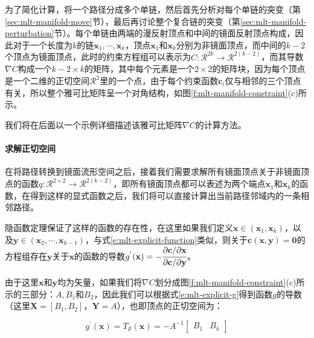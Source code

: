 为了简化计算，\cite{a:ManifoldExplorationAMarkovChainMonteCarloTechniqueforRenderingSceneswithDifficultSpecularTransport}将一个路径分成多个单链，然后首先分析对每个单链的突变（第\ref{sec:mlt-manifold-move}节），最后再讨论整个复合链的突变（第\ref{sec:mlt-manifold-perturbation}节）。每个单链由两端的漫反射顶点和中间的镜面反射顶点构成，因此对于一个长度为$k$的链$\mathbf{x}_1,\cdots,\mathbf{x}_k$，顶点$\mathbf{x}_1$和$\mathbf{x}_k$分别为非镜面顶点，而中间的$k-2$个顶点为镜面顶点，此时的约束方程组可以表示为$C:\mathcal{R}^{2k}\to\mathcal{R}^{2(k-2)}$，而其导数$\nabla C$构成一个$k-2\times k$的矩阵，其中每个元素是一个$2\times 2$的矩阵块，因为每个顶点是一个二维的正切空间$\mathcal{R}^{2}$里的一个点，由于每个约束函数$\mathbf{c}_i$仅与相邻的三个顶点有关，所以整个雅可比矩阵呈一个对角结构，如图\ref{f:mlt-manifold-constraint}(c)所示。

我们将在后面以一个示例详细描述该雅可比矩阵$\nabla C$的计算方法。




\paragraph{求解正切空间}
在将路径转换到镜面流形空间之后，接着我们需要求解所有镜面顶点关于非镜面顶点的函数$q:\mathcal{R}^{2\times 2}\to\mathcal{R}^{2(k-2)}$，即所有镜面顶点都可以表述为两个端点$\mathbf{x}_1$和$\mathbf{x}_k$的函数，在得到这样的显式函数之后，我们将可以直接计算出当前路径邻域内的一条相邻路径。

隐函数定理保证了这样的函数的存在性，在这里如果我们定义$\mathbf{x}\in (\mathbf{x}_1,\mathbf{x}_k)$，以及$\mathbf{y}\in (\mathbf{x}_2,\cdots,\mathbf{x}_{k-1})$，与式\ref{e:mlt-explicit-function}类似，则关于$\mathbf{c}(\mathbf{x},\mathbf{y})=\mathbf{0}$的方程组存在$\mathbf{y}$关于$\mathbf{x}$的函数的导数$g^{'}(\mathbf{x})=-\cfrac{{\rm \partial} \mathbf{c}/{\rm \partial} \mathbf{x}}{{\rm \partial} \mathbf{c}/{\rm \partial} \mathbf{y}}$。

由于这里$\mathbf{x}$和$\mathbf{y}$均为矢量，如果我们将$\nabla C$划分成图\ref{f:mlt-manifold-constraint}(c)所示的三部分：$A,B_1$和$B_2$，因此我们可以根据式\ref{e:mlt-explicit-g}得到函数$g$的导数（这里$\mathbf{X}=[B_1,B_2]$，$\mathbf{Y}=A$），也即顶点的正切空间为：

\begin{equation}
	g^{'}({\mathbf{x}})=T_{\mathcal{S}}({\mathbf{x}})=-A^{-1}\begin{bmatrix}
		B_1 &B_k
	\end{bmatrix}
\end{equation}

